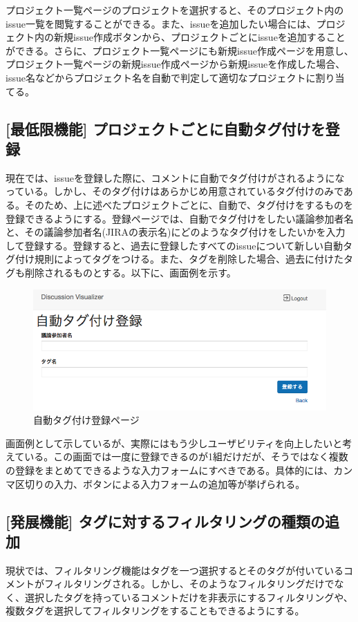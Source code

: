 \documentclass[12pt, oneside]{jreport}
\begin{document}
		プロジェクト一覧ページのプロジェクトを選択すると、そのプロジェクト内のissue一覧を閲覧することができる。また、issueを追加したい場合には、プロジェクト内の新規issue作成ボタンから、プロジェクトごとにissueを追加することができる。さらに、プロジェクト一覧ページにも新規issue作成ページを用意し、プロジェクト一覧ページの新規issue作成ページから新規issueを作成した場合、issue名などからプロジェクト名を自動で判定して適切なプロジェクトに割り当てる。
		
		\subsection{[最低限機能] プロジェクトごとに自動タグ付けを登録}
		現在では、issueを登録した際に、コメントに自動でタグ付けがされるようになっている。しかし、そのタグ付けはあらかじめ用意されているタグ付けのみである。そのため、上に述べたプロジェクトごとに、自動で、タグ付けをするものを登録できるようにする。登録ページでは、自動でタグ付けをしたい議論参加者名と、その議論参加者名(JIRAの表示名)にどのようなタグ付けをしたいかを入力して登録する。登録すると、過去に登録したすべてのissueについて新しい自動タグ付け規則によってタグをつける。また、タグを削除した場合、過去に付けたタグも削除されるものとする。以下に、画面例を示す。
		\begin{figure}[H]
		\centering
		\includegraphics[width=17cm,bb=500 300 -200 27]{TagAdd.png}
		\caption{自動タグ付け登録ページ}
		\end{figure}
		
		画面例として示しているが、実際にはもう少しユーザビリティを向上したいと考えている。この画面では一度に登録できるのが1組だけだが、そうではなく複数の登録をまとめてできるような入力フォームにすべきである。具体的には、カンマ区切りの入力、ボタンによる入力フォームの追加等が挙げられる。

		\subsection{[発展機能] タグに対するフィルタリングの種類の追加}
		現状では、フィルタリング機能はタグを一つ選択するとそのタグが付いているコメントがフィルタリングされる。しかし、そのようなフィルタリングだけでなく、選択したタグを持っているコメントだけを非表示にするフィルタリングや、複数タグを選択してフィルタリングをすることもできるようにする。
\end{document}
